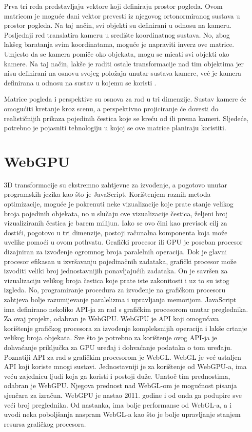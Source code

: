 \documentclass{foi}
\begin{document}
Prva tri reda predstavljaju vektore koji definiraju prostor pogleda. Ovom matricom je moguće dani vektor prevesti iz njegovog ortonormiranog sustava u prostor pogleda. Na taj način, svi objekti su definirani u odnosu na kameru. Posljednji red translatira kameru u središte koordinatnog sustava. No, zbog lakšeg baratanja svim koordinatama, moguće je napraviti inverz ove matrice. Umjesto da se kamera pomiče oko objekata, mogu se micati svi objekti oko kamere. Na taj način, lakše je raditi ostale transformacije nad tim objektima jer nisu definirani na osnovu svojeg položaja unutar sustava kamere, već je kamera definirana u odnosu na sustav u kojemu se koristi \parencite{KameraBezDat}.

Matrice pogleda i perspektive su osnova za rad u tri dimenzije. Sustav kamere će omogućiti kretanje kroz scenu, a perspektivno projiciranje će dovesti do realističnijih prikaza pojedinih čestica koje se kreću od ili prema kameri. Sljedeće, potrebno je pojasniti tehnologiju u kojoj se ove matrice planiraju koristiti.

\section{WebGPU}
3D transformacije su ekstremno zahtjevne za izvođenje, a pogotovo unutar programskih jezika kao što je JavaScript. Korištenjem raznih metoda optimizacije, moguće je pokrenuti neke vizualizacije koje prate stanje velikog broja pojedinih objekata, no u slučaju ove vizualizacije čestica, željeni broj vizualiziranih čestica je barem milijun. Iako se ovo čini kao previsok cilj za dostići, pogotovo u tri dimenzije, postoji računalna komponenta koja može uvelike pomoći u ovom pothvatu. Grafički procesor ili GPU je poseban procesor dizajniran za izvođenje ogromnog broja paralelnih operacija. Dok je glavni procesor efikasan u izvršavanju pojedinačnih zadataka, grafički procesor može izvoditi veliki broj jednostavnijih ponavljajućih zadataka. On je savršen za vizualizaciju velikog broja čestica koje prate iste zakonitosti i uz to su istog izgleda. No, programiranje procedura za izvođenje na grafičkom procesoru zahtjeva bolje razumijevanje paralelizma i upravljanja memorijom. JavaScript ima definirano nekoliko API-ja za rad s grafičkim procesorom unutar preglednika. Za ovaj projekt, odabran je WebGPU.  WebGPU je API koji omogućava korištenje grafičkog procesora za izvođenje kompleksnijih operacija i lakše crtanje velikog broja objekata. Sve što je potrebno za korištenje ovog API-ja je dohvaćanje priključka za GPU uređaj i dohvaćanje podataka o tom uređaju. Poznatiji API za rad s grafičkim procesorom je WebGL. WebGL je već ustaljen API koji koriste mnogi sustavi. Jednostavniji je za korištenje od WebGPU-a, ima veću zajednicu ljudi koja ga koristi i postoji duže. Unatoč tim prednostima, odabran je WebGPU. Njegova prednost nad WebGL-om je mogućnost pisanja sjenčara za izračun. WebGPU je nastao 2011. godine i od onda ga podupire sve veći broj preglednika. Od nastanka, ima bolje performanse od WebGL-a, a i uvodi neka poboljšanja naspram WebGL-a kao što je bolje upravljanje stanjem resursa grafičkog procesora\parencite{DocWebGPU}. 
\end{document}
